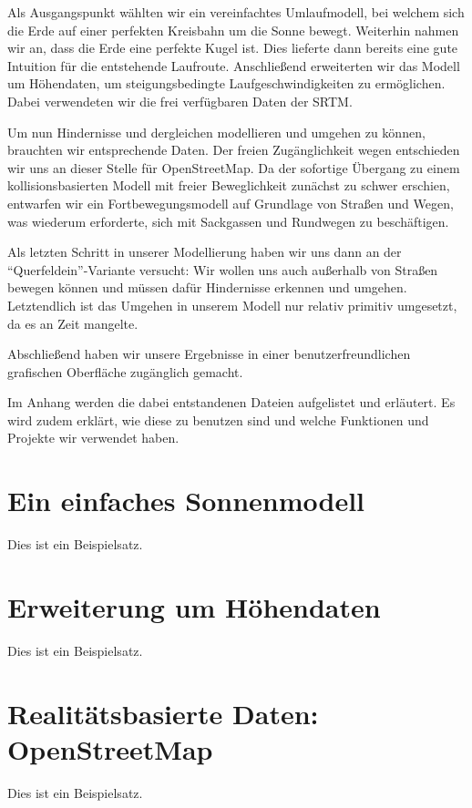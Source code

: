 \documentclass[
    paper=a4,
    DIV14,
    fontsize=12pt,
    pagesize=pdftex,
    toc=bibliographynumbered
]{scrartcl}
\numberwithin{figure}{section}
\numberwithin{equation}{section}
\numberwithin{table}{section}
\begin{document}
Als Ausgangspunkt wählten wir ein vereinfachtes Umlaufmodell, bei welchem sich die Erde
auf einer perfekten Kreisbahn um die Sonne bewegt. Weiterhin nahmen wir an, dass die Erde
eine perfekte Kugel ist. Dies lieferte dann bereits eine gute Intuition für die
entstehende Laufroute. Anschließend erweiterten wir das Modell um Höhendaten, um
steigungsbedingte Laufgeschwindigkeiten zu ermöglichen. Dabei verwendeten wir die frei
verfügbaren Daten der SRTM.

Um nun Hindernisse und dergleichen modellieren und umgehen zu können, brauchten wir
entsprechende Daten. Der freien Zugänglichkeit wegen entschieden wir uns an dieser Stelle
für OpenStreetMap. Da der sofortige Übergang zu einem kollisionsbasierten Modell mit
freier Beweglichkeit zunächst zu schwer erschien, entwarfen wir ein Fortbewegungsmodell
auf Grundlage von Straßen und Wegen, was wiederum erforderte, sich mit Sackgassen und
Rundwegen zu beschäftigen.

Als letzten Schritt in unserer Modellierung haben wir uns dann an der
\enquote{Querfeldein}-Variante versucht: Wir wollen uns auch außerhalb von Straßen bewegen
können und müssen dafür Hindernisse erkennen und umgehen. Letztendlich ist das Umgehen in
unserem Modell nur relativ primitiv umgesetzt, da es an Zeit mangelte.

Abschließend haben wir unsere Ergebnisse in einer benutzerfreundlichen grafischen
Oberfläche zugänglich gemacht.

Im Anhang werden die dabei entstandenen Dateien aufgelistet und erläutert. Es wird zudem
erklärt, wie diese zu benutzen sind und welche Funktionen und Projekte wir verwendet haben.

\section{Ein einfaches Sonnenmodell}

Dies ist ein Beispielsatz.

\section{Erweiterung um Höhendaten}

Dies ist ein Beispielsatz.

\section{Realitätsbasierte Daten: OpenStreetMap}

Dies ist ein Beispielsatz.
\end{document}
